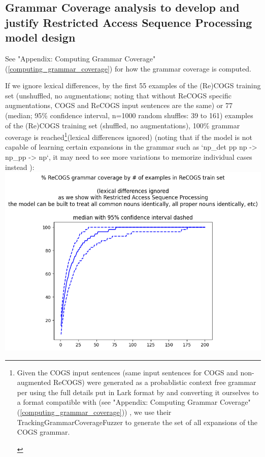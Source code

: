 \documentclass[11pt]{article}
\begin{document}
\subsection{Grammar Coverage analysis to develop and justify Restricted Access Sequence Processing model design}
\label{grammar_coverage_analysis_for_model_design}

See "Appendix: Computing Grammar Coverage" (\ref{computing_grammar_coverage}) for how the grammar coverage is computed.

If we ignore lexical differences, by the first 55 examples of the (Re)COGS training set (unshuffled, no augmentations; noting that without ReCOGS specific augmentations, COGS and ReCOGS input sentences are the same) or 77 (median; 95\% confidence interval, n=1000 random shuffles: 39 to 161) examples of the (Re)COGS training set (shuffled, no augmentations), 100\% grammar coverage is reached\footnote{\begin{footnotesize}Given the COGS input sentences (same input sentences for COGS and non-augmented ReCOGS) were generated as a probablistic context free grammar per \cite{KimLinzen2020}
using the full details put in Lark format by \cite{klinger2024compositionalprogramgenerationfewshot}
and converting it ourselves to a format compatible with \cite{fuzzingbook2023:GrammarCoverageFuzzer} (see "Appendix: Computing Grammar Coverage" (\ref{computing_grammar_coverage})) , we use their TrackingGrammarCoverageFuzzer to generate the set of all expansions of the COGS grammar.
\end{footnotesize}
}(lexical differences ignored) \cite{fuzzingbook2023:GrammarCoverageFuzzer} (noting that if the model is not capable of learning certain expansions in the grammar such as `np\_det pp np -> np\_pp -> np`, it may need to see more variations to memorize individual cases instead ):
\includegraphics[scale=0.38]{grammar_coverage_by_number_of_recogs_training_examples_lexical_differences_ignored.png}
\end{document}
